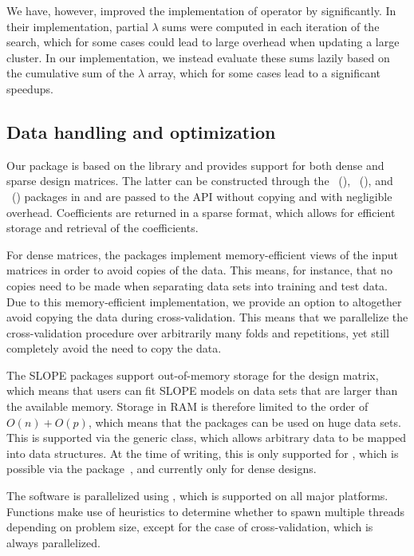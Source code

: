 \documentclass[article]{jss}
\begin{document}
We have, however, improved the implementation of operator by
\citet{larsson2023} significantly. In their implementation, partial \(\lambda\)
sums were computed in each iteration of the search, which for some cases could
lead to large overhead when updating a large cluster. In our implementation, we
instead evaluate these sums lazily based on the cumulative sum of the
\(\lambda\) array, which for some cases lead to a significant speedups.

\subsection{Data handling and optimization}

Our package is based on the   library and provides
support for both dense and sparse design matrices. The latter can be
constructed through the ~(),
~(), and ~()
packages in and are passed to the  API without copying
and with negligible overhead. Coefficients are returned in a sparse format, which
allows for efficient storage and retrieval of the coefficients.

For dense matrices, the packages implement memory-efficient views of
the input matrices in order to avoid copies of the data. This means, for instance, that no copies need to be made when separating
data sets into training and test data. Due to this memory-efficient implementation, we provide
an option to altogether avoid copying the data during cross-validation.
This means that we parallelize the cross-validation procedure over
arbitrarily many folds and repetitions, yet still completely
avoid the need to copy the data.

The SLOPE packages support out-of-memory storage for the design matrix, which
means that users can fit SLOPE models on data sets that are larger than the
available memory. Storage in RAM is therefore limited to the order of \(O(n) +
O(p)\), which means that the packages can be used on huge data sets.
This is supported via the generic  class, which allows
arbitrary data to be mapped into  data structures. At the
time of writing, this is only supported for ,
which is possible via the  package~\citep{kane2013},
and currently only for dense designs.

The software is parallelized using , which is supported on all
major platforms. Functions make use of heuristics to
determine whether to spawn multiple threads depending on problem size, except
for the case of cross-validation, which is always parallelized.
\end{document}
